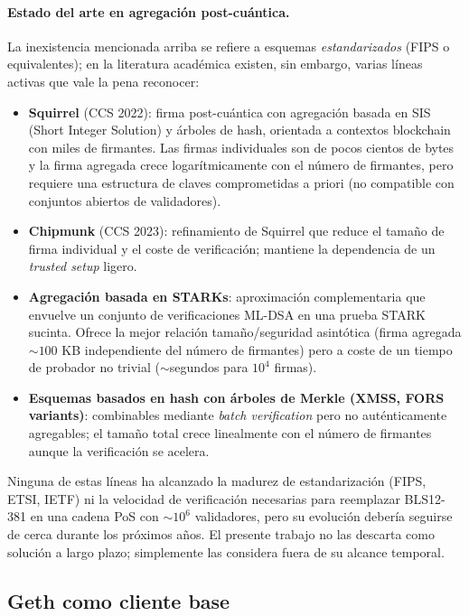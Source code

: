 \paragraph{Estado del arte en agregación post-cuántica.} La inexistencia mencionada arriba se refiere a esquemas \emph{estandarizados} (FIPS o equivalentes); en la literatura académica existen, sin embargo, varias líneas activas que vale la pena reconocer:
\begin{itemize}
  \item \textbf{Squirrel} \parencite{fleischhacker2022squirrel} (CCS 2022): firma post-cuántica con agregación basada en SIS (Short Integer Solution) y árboles de hash, orientada a contextos blockchain con miles de firmantes. Las firmas individuales son de pocos cientos de bytes y la firma agregada crece logarítmicamente con el número de firmantes, pero requiere una estructura de claves comprometidas a priori (no compatible con conjuntos abiertos de validadores).
  \item \textbf{Chipmunk} \parencite{fleischhacker2023chipmunk} (CCS 2023): refinamiento de Squirrel que reduce el tamaño de firma individual y el coste de verificación; mantiene la dependencia de un \emph{trusted setup} ligero.
  \item \textbf{Agregación basada en STARKs}: aproximación complementaria que envuelve un conjunto de verificaciones ML-DSA en una prueba STARK sucinta. Ofrece la mejor relación tamaño/seguridad asintótica (firma agregada $\sim 100$ KB independiente del número de firmantes) pero a coste de un tiempo de probador no trivial ($\sim$segundos para $10^4$ firmas).
  \item \textbf{Esquemas basados en hash con árboles de Merkle (XMSS, FORS variants)}: combinables mediante \emph{batch verification} pero no auténticamente agregables; el tamaño total crece linealmente con el número de firmantes aunque la verificación se acelera.
\end{itemize}
Ninguna de estas líneas ha alcanzado la madurez de estandarización (FIPS, ETSI, IETF) ni la velocidad de verificación necesarias para reemplazar BLS12-381 en una cadena PoS con $\sim 10^6$ validadores, pero su evolución debería seguirse de cerca durante los próximos años. El presente trabajo no las descarta como solución a largo plazo; simplemente las considera fuera de su alcance temporal.

\subsection{Geth como cliente base}

